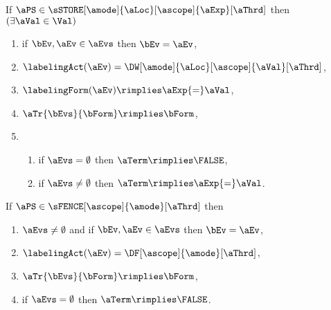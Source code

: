 \begin{definition}
  \noindent
  If $\aPS \in \sSTORE[\amode]{\aLoc}[\ascope]{\aExp}[\aThrd]$ then
  $(\exists\aVal\in\Val)$
  \begin{multicols}{2}
    \begin{enumerate}[topsep=0pt,label=(\textsc{w}\arabic*),ref=\textsc{w}\arabic*]
    \item \label{write-E}
      if $\bEv,\aEv\in\aEvs$ then $\bEv=\aEv$,
    \item \label{write-lambda}
      $\labelingAct(\aEv) = \DW[\amode]{\aLoc}[\ascope]{\aVal}[\aThrd]$,
    \item \label{write-kappa}
      \begin{math}
        \labelingForm(\aEv) \rimplies
        \aExp{=}\aVal
      \end{math},    
    \item \label{write-tau}
      \begin{math}
        \aTr{\bEvs}{\bForm} \rimplies 
        \bForm
      \end{math},
    \item[] 
      \begin{enumerate}[leftmargin=0pt]
      \item \label{write-term-empty}
        if $\aEvs=\emptyset$ then $\aTerm \rimplies \FALSE$,
      \item \label{write-term-nonempty}
        if $\aEvs\neq\emptyset$ then $\aTerm \rimplies \aExp{=}\aVal$.
      \end{enumerate}
    \end{enumerate}
  \end{multicols}
  \medskip

  \noindent
  If $\aPS \in \sFENCE[\ascope]{\amode}[\aThrd]$ then
  \begin{multicols}{2}
    \begin{enumerate}[topsep=0pt,label=(\textsc{f}\arabic*),ref=\textsc{f}\arabic*]
    \item \label{fork-E}
      $\aEvs\neq\emptyset$ and if $\bEv,\aEv\in\aEvs$ then $\bEv=\aEv$,
    \item \label{fork-lambda}
      $\labelingAct(\aEv) = \DF[\ascope]{\amode}[\aThrd]$,
    \item \label{fork-tau}
      $\aTr{\bEvs}{\bForm} \rimplies \bForm$,
    \item \label{fork-term}
      if $\aEvs=\emptyset$ then $\aTerm \rimplies \FALSE$.
    \end{enumerate}
  \end{multicols}
  \medskip


\end{definition}
